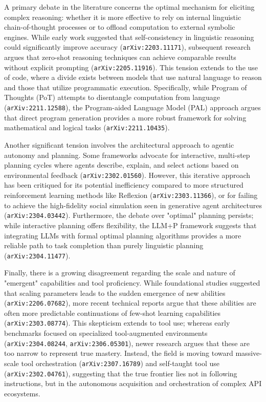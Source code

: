 \documentclass[11pt]{article}
\begin{document}
A primary debate in the literature concerns the optimal mechanism for eliciting complex reasoning: whether it is more effective to rely on internal linguistic chain-of-thought processes or to offload computation to external symbolic engines. While early work suggested that self-consistency in linguistic reasoning could significantly improve accuracy (\texttt{arXiv:2203.11171}), subsequent research argues that zero-shot reasoning techniques can achieve comparable results without explicit prompting (\texttt{arXiv:2205.11916}). This tension extends to the use of code, where a divide exists between models that use natural language to reason and those that utilize programmatic execution. Specifically, while Program of Thoughts (PoT) attempts to disentangle computation from language (\texttt{arXiv:2211.12588}), the Program-aided Language Model (PAL) approach argues that direct program generation provides a more robust framework for solving mathematical and logical tasks (\texttt{arXiv:2211.10435}).

Another significant tension involves the architectural approach to agentic autonomy and planning. Some frameworks advocate for interactive, multi-step planning cycles where agents describe, explain, and select actions based on environmental feedback (\texttt{arXiv:2302.01560}). However, this iterative approach has been critiqued for its potential inefficiency compared to more structured reinforcement learning methods like Reflexion (\texttt{arXiv:2303.11366}), or for failing to achieve the high-fidelity social simulation seen in generative agent architectures (\texttt{arXiv:2304.03442}). Furthermore, the debate over "optimal" planning persists; while interactive planning offers flexibility, the LLM+P framework suggests that integrating LLMs with formal optimal planning algorithms provides a more reliable path to task completion than purely linguistic planning (\texttt{arXiv:2304.11477}).

Finally, there is a growing disagreement regarding the scale and nature of "emergent" capabilities and tool proficiency. While foundational studies suggested that scaling parameters leads to the sudden emergence of new abilities (\texttt{arXiv:2206.07682}), more recent technical reports argue that these abilities are often more predictable continuations of few-shot learning capabilities (\texttt{arXiv:2303.08774}). This skepticism extends to tool use; whereas early benchmarks focused on specialized tool-augmented environments (\texttt{arXiv:2304.08244}, \texttt{arXiv:2306.05301}), newer research argues that these are too narrow to represent true mastery. Instead, the field is moving toward massive-scale tool orchestration (\texttt{arXiv:2307.16789}) and self-taught tool use (\texttt{arXiv:2302.04761}), suggesting that the true frontier lies not in following instructions, but in the autonomous acquisition and orchestration of complex API ecosystems.
\end{document}
